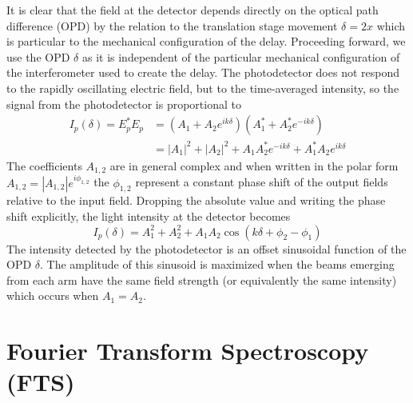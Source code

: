 \documentclass[8pt,a4paper]{article}
\begin{document}
	It is clear that the field at the detector depends directly on the optical path difference (OPD) by the relation to the translation stage movement $\delta = 2x$ which is particular to the mechanical configuration of the delay. Proceeding forward, we use the OPD $\delta$ as it is independent of the particular mechanical configuration of the interferometer used to create the delay. The photodetector does not respond to the rapidly oscillating electric field, but to the time-averaged intensity, so the signal from the photodetector is proportional to
	\begin{align}
		I_p(\delta) = E_p^*E_p &= \left(A_1 + A_2 e^{ik\delta}\right)\left(A_1^* + A_2^* e^{-ik\delta}\right) \nonumber\\
		&= \left|A_1\right|^2 + \left|A_2\right|^2 + A_1A_2^*e^{-ik\delta} + A_1^*A_2e^{ik\delta}
	\end{align}
	The coefficients $A_{1,2}$ are in general complex and when written in the polar form $A_{1,2} = \left|A_{1,2}\right| e^{i\phi_{1,2}}$ the $\phi_{1,2}$ represent a constant phase shift of the output fields relative to the input field. Dropping the absolute value and writing the phase shift explicitly, the light intensity at the detector becomes
	\begin{equation}\label{wl_sig_monochromatic}
		\boxed{I_p(\delta) = A_1^2 + A_2^2 + A_1A_2\cos(k\delta + \phi_2 - \phi_1)}
	\end{equation}
	The intensity detected by the photodetector is an offset sinusoidal function of the OPD $\delta$. The amplitude of this sinusoid is maximized when the beams emerging from each arm have the same field strength (or equivalently the same intensity) which occurs when $A_1 = A_2$.
	

	\section{Fourier Transform Spectroscopy (FTS)} \label{sec:wl_FTIR}
\end{document}

